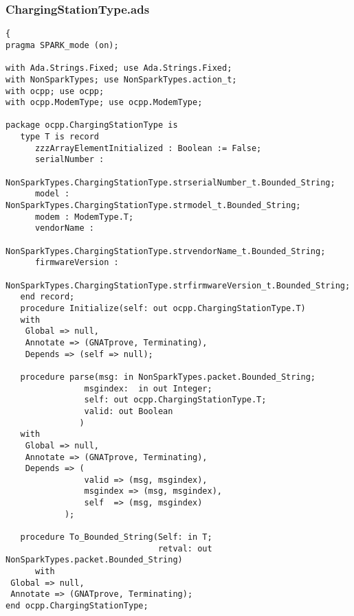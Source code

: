 \documentclass[12pt,openany,a4paper]{book}
\begin{document}
\subsubsection{ChargingStationType.ads}
\begin{verbatim}
{
pragma SPARK_mode (on); 

with Ada.Strings.Fixed; use Ada.Strings.Fixed;
with NonSparkTypes; use NonSparkTypes.action_t; 
with ocpp; use ocpp;
with ocpp.ModemType; use ocpp.ModemType;

package ocpp.ChargingStationType is
   type T is record
      zzzArrayElementInitialized : Boolean := False;
      serialNumber : 
         NonSparkTypes.ChargingStationType.strserialNumber_t.Bounded_String;
      model : NonSparkTypes.ChargingStationType.strmodel_t.Bounded_String;
      modem : ModemType.T;
      vendorName : 
         NonSparkTypes.ChargingStationType.strvendorName_t.Bounded_String;
      firmwareVersion : 
         NonSparkTypes.ChargingStationType.strfirmwareVersion_t.Bounded_String;
   end record;
   procedure Initialize(self: out ocpp.ChargingStationType.T)
   with
    Global => null,
    Annotate => (GNATprove, Terminating),
    Depends => (self => null);

   procedure parse(msg: in NonSparkTypes.packet.Bounded_String;
                msgindex:  in out Integer;
                self: out ocpp.ChargingStationType.T;
                valid: out Boolean
               )
   with
    Global => null,
    Annotate => (GNATprove, Terminating),
    Depends => (
                valid => (msg, msgindex),
                msgindex => (msg, msgindex),
                self  => (msg, msgindex)
            );

   procedure To_Bounded_String(Self: in T;
                               retval: out NonSparkTypes.packet.Bounded_String)
      with
 Global => null,
 Annotate => (GNATprove, Terminating);
end ocpp.ChargingStationType;\end{verbatim}
\end{document}
